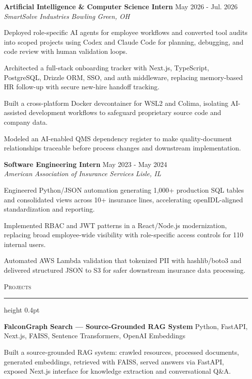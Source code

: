 \documentclass[letterpaper,11pt]{article}
\newcommand{\resumesection}[1]{%
  \par\vspace{2pt}%
  {\large\scshape #1}\par\vspace{2pt}%
  \hrule height 0.4pt\vspace{2pt}%
}
\newcommand{\resumeSubheading}[4]{
  \textbf{#1} \hfill #2\\
  \textit{#3} \hfill \textit{#4}
}
\newcommand{\projectHeading}[2]{
  \textbf{#1} \hfill #2
}
\begin{document}
\resumeSubheading
{Artificial Intelligence \& Computer Science Intern}{May 2026 - Jul. 2026}
{SmartSolve Industries}{Bowling Green, OH}
\begin{tightitemize}
  \item Deployed role-specific AI agents for employee workflows and converted tool audits into scoped projects using Codex and Claude Code for planning, debugging, and code review with human validation loops.
  \item Architected a full-stack onboarding tracker with Next.js, TypeScript, PostgreSQL, Drizzle ORM, SSO, and auth middleware, replacing memory-based HR follow-up with secure new-hire handoff tracking.
  \item Built a cross-platform Docker devcontainer for WSL2 and Colima, isolating AI-assisted development workflows to safeguard proprietary source code and company data.
  \item Modeled an AI-enabled QMS dependency register to make quality-document relationships traceable before process changes and downstream implementation.
\end{tightitemize}

\resumeSubheading
{Software Engineering Intern}{May 2023 - May 2024}
{American Association of Insurance Services}{Lisle, IL}
\begin{tightitemize}
  \item Engineered Python/JSON automation generating 1,000+ production SQL tables and consolidated views across 10+ insurance lines, accelerating openIDL-aligned standardization and reporting.
  \item Implemented RBAC and JWT patterns in a React/Node.js modernization, replacing broad employee-wide visibility with role-specific access controls for 110 internal users.
  \item Automated AWS Lambda validation that tokenized PII with hashlib/boto3 and delivered structured JSON to S3 for safer downstream insurance data processing.
\end{tightitemize}

\resumesection{Projects}
\projectHeading{FalconGraph Search — Source-Grounded RAG System}{Python, FastAPI, Next.js, FAISS, Sentence Transformers, OpenAI Embeddings}
\begin{tightitemize}
  \item Built a source-grounded RAG system: crawled resources, processed documents, generated embeddings, retrieved with FAISS, served answers via FastAPI, exposed Next.js interface for knowledge extraction and conversational Q\&A.
\end{tightitemize}
\end{document}
